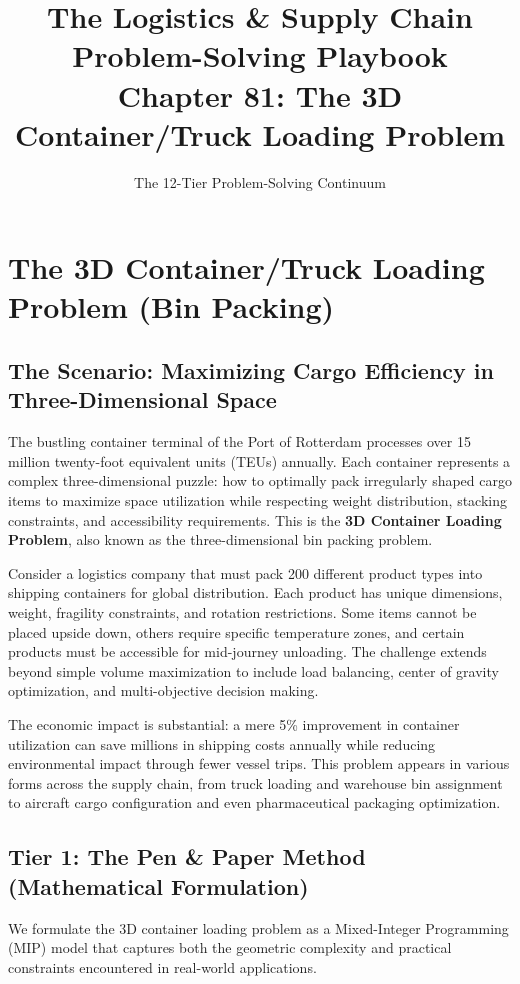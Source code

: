 \documentclass{article}
\title{The Logistics \& Supply Chain Problem-Solving Playbook\\
Chapter 81: The 3D Container/Truck Loading Problem}
\author{The 12-Tier Problem-Solving Continuum}
\date{}
\begin{document}
\maketitle

\section{The 3D Container/Truck Loading Problem (Bin Packing)}

\subsection{The Scenario: Maximizing Cargo Efficiency in Three-Dimensional Space}

The bustling container terminal of the Port of Rotterdam processes over 15 million twenty-foot equivalent units (TEUs) annually. Each container represents a complex three-dimensional puzzle: how to optimally pack irregularly shaped cargo items to maximize space utilization while respecting weight distribution, stacking constraints, and accessibility requirements. This is the \textbf{3D Container Loading Problem}, also known as the three-dimensional bin packing problem.

Consider a logistics company that must pack 200 different product types into shipping containers for global distribution. Each product has unique dimensions, weight, fragility constraints, and rotation restrictions. Some items cannot be placed upside down, others require specific temperature zones, and certain products must be accessible for mid-journey unloading. The challenge extends beyond simple volume maximization to include load balancing, center of gravity optimization, and multi-objective decision making.

The economic impact is substantial: a mere 5\% improvement in container utilization can save millions in shipping costs annually while reducing environmental impact through fewer vessel trips. This problem appears in various forms across the supply chain, from truck loading and warehouse bin assignment to aircraft cargo configuration and even pharmaceutical packaging optimization.

\subsection{Tier 1: The Pen \& Paper Method (Mathematical Formulation)}

We formulate the 3D container loading problem as a Mixed-Integer Programming (MIP) model that captures both the geometric complexity and practical constraints encountered in real-world applications.
\end{document}
